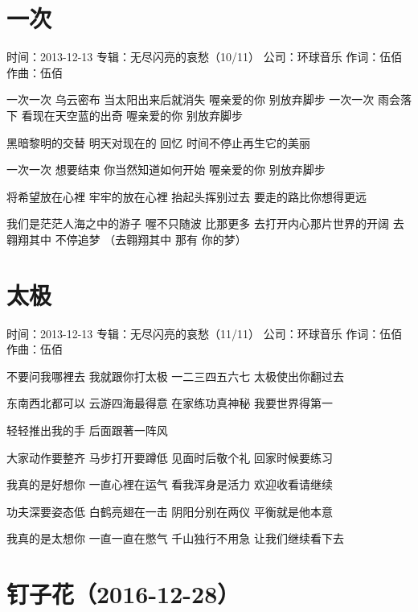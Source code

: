 \documentclass[UTF8,a4paper,oneside,twocolumn,12pt]{ctexbook}
\newcommand{\infopair}[2]{\textbullet #1：#2}
\newcommand{\zc}[1][伍佰]{\infopair{作词}{#1}}
\newcommand{\zq}[1][伍佰]{\infopair{作曲}{#1}}
\newcommand{\zj}[1]{\infopair{专辑}{#1}}
\newcommand{\sj}[1]{\infopair{时间}{#1}}
\newcommand{\gs}[1]{\infopair{公司}{#1}}
\newenvironment{info}{\begin{flushleft}\kaishu
	}
	{\end{flushleft}\normalsize\yahei\par}
\newenvironment{lyric}{
	}
{}
\begin{document}
\section{一次}
\begin{info}
	\sj{2013-12-13}
	\zj{无尽闪亮的哀愁（10/11）}
	\gs{环球音乐}
	\zc
	\zq
\end{info}
\begin{lyric}
	一次一次 乌云密布 当太阳出来后就消失
	喔亲爱的你 别放弃脚步
	一次一次 雨会落下 看现在天空蓝的出奇
	喔亲爱的你 别放弃脚步

	黑暗黎明的交替 明天对现在的 回忆
	时间不停止再生它的美丽

	一次一次 想要结束 你当然知道如何开始
	喔亲爱的你 别放弃脚步

	将希望放在心裡 牢牢的放在心裡
	抬起头挥别过去 要走的路比你想得更远

	我们是茫茫人海之中的游子
	喔不只随波 比那更多
	去打开内心那片世界的开阔
	去翱翔其中 不停追梦
	（去翱翔其中 那有 你的梦）
\end{lyric}

\section{太极}
\begin{info}
	\sj{2013-12-13}
	\zj{无尽闪亮的哀愁（11/11）}
	\gs{环球音乐}
	\zc
	\zq
\end{info}
\begin{lyric}
	不要问我哪裡去 我就跟你打太极
	一二三四五六七 太极使出你翻过去

	东南西北都可以 云游四海最得意
	在家练功真神秘 我要世界得第一

	轻轻推出我的手 后面跟著一阵风

	大家动作要整齐 马步打开要蹲低
	见面时后敬个礼 回家时候要练习

	我真的是好想你 一直心裡在运气
	看我浑身是活力 欢迎收看请继续

	功夫深要姿态低 白鹤亮翅在一击
	阴阳分别在两仪 平衡就是他本意

	我真的是太想你 一直一直在憋气
	千山独行不用急 让我们继续看下去
\end{lyric}

\section*{钉子花（2016-12-28）}
\end{document}
